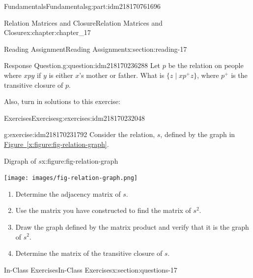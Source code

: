 \documentclass[oneside,10pt,]{book}
\newcommand{\xreffont}{\relax}
\numberwithin{equation}{section}
\begin{document}
\begin{partptx}{Fundamentals}{}{Fundamentals}{}{}{g:part:idm218170761696}
\begin{chapterptx}{Relation Matrices and Closure}{}{Relation Matrices and Closure}{}{}{x:chapter:chapter_17}
\begin{sectionptx}{Reading Assignment}{}{Reading Assignment}{}{}{x:section:reading-17}
\begin{question}{Response Question.}{g:question:idm218170236288}
Let \(p\) be the relation on people where \(x p y\) if \(y\) is either \(x\)'s mother or father.   What is \(\{z \mid x p^+ z\}\), where \(p^+\) is the transitive closure of \(p\).%
\end{question}
Also, turn in solutions to this exercise:%
%
%
\typeout{************************************************}
\typeout{************************************************}
%
\begin{exercises-subsection-numberless}{Exercises}{}{Exercises}{}{}{g:exercises:idm218170232048}
\par\medskip\noindent%
%
\begin{exercisegroup}
\begin{divisionexerciseeg}{1}{}{}{g:exercise:idm218170231792}%
Consider the relation, \(s\), defined by the graph in \hyperref[x:figure:fig-relation-graph]{Figure~{\xreffont\ref{x:figure:fig-relation-graph}}}.%
\begin{figureptx}{Digraph of \(s\)}{x:figure:fig-relation-graph}{}%
\begin{image}{0.25}{0.5}{0.25}%
\texttt{[image: images/fig-relation-graph.png]}
\end{image}%
\tcblower
\end{figureptx}%
%
\begin{enumerate}[label=(\alph*)]
\item{}Determine the adjacency matrix of \(s\).%
\item{}Use the matrix you have constructed to find the matrix of \(s^2\).%
\item{}Draw the graph defined by the matrix product and verify that it is the graph of \(s^2\).%
\item{}Determine the matrix of the transitive closure of \(s\).%
\end{enumerate}
%
\end{divisionexerciseeg}%
\end{exercisegroup}
\par\medskip\noindent
\end{exercises-subsection-numberless}
\end{sectionptx}
%
%
\typeout{************************************************}
\typeout{************************************************}
%
\begin{sectionptx}{In-Class Exercises}{}{In-Class Exercises}{}{}{x:section:questions-17}
%
%
%
\typeout{************************************************}

\end{sectionptx}
\end{chapterptx}
\end{partptx}
\end{document}
